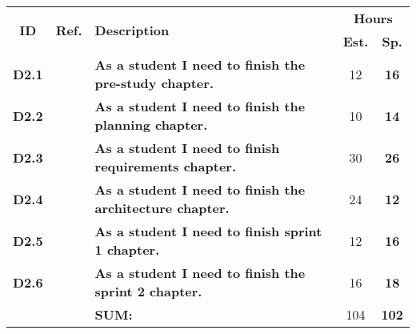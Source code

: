 \label{tab:sprint2Documentationstories}
\def\arraystretch{1.25}
 
\begin{longtable}{ccXcc}

\toprule[0.5mm]
\multirow{2}{*}{\textbf{ID}} &
\multirow{2}{*}{\textbf{Ref.}} & \multirow{2}{*}{\textbf{Description}} & \multicolumn{2}{c}{\textbf{Hours}} \\
 					& & & \textbf{Est.} & \textbf{Sp.} \\
\midrule


\textbf{D2.1} 	& 	& {\bf As a student I need to finish the pre-study chapter.} 									& 	12	& \textbf{ 16} \\

\textbf{D2.2} 	& 	& {\bf As a student I need to finish the planning chapter.} 									& 	10	& \textbf{ 14} \\

\textbf{D2.3} 	& 	& {\bf As a student I need to finish requirements chapter.} 									& 	30	& \textbf{ 26} \\

\textbf{D2.4} 	&   & {\bf As a student I need to finish the architecture chapter.} 								& 	24	& \textbf{ 12} \\

\textbf{D2.5} 	& 	& {\bf As a student I need to finish sprint 1 chapter.} 										& 	12	& \textbf{ 16} \\

\textbf{D2.6} 	& 	& {\bf As a student I need to finish the  sprint 2 chapter.} 									& 	16	& \textbf{ 18} \\

								
\hline
				&& \textbf{SUM:}		&		104	& \textbf{102}
 \\																			
\bottomrule[0.5mm]
\end{longtable}
